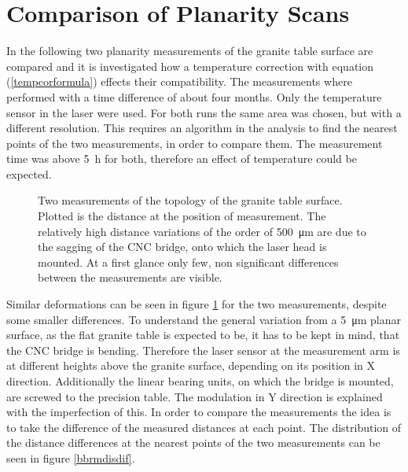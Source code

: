 \documentclass[
a4paper,                                %
twoside,                                %
BCOR1.4cm,                      %
10pt,                           %
headings=normal,                %
headsepline,                    %
clearplainpage, %
final,                                  %
div=14,
parskip=full,
openright,
bibliography=toc
]{scrreprt}
\begin{document}
\section{Comparison of Planarity Scans}\label{complanscan}

In the following two planarity measurements of the granite table surface are compared and it is investigated how a temperature correction with equation (\ref{tempcorformula}) effects their compatibility. The measurements where performed with a time difference of about four months. Only the temperature sensor in the laser were used. For both runs the same area was chosen, but with a different resolution. This requires an algorithm in the analysis to find the nearest points of the two measurements, in order to compare them. The measurement time was above \SI{5}{\hour} for both, therefore an effect of temperature could be expected.

\begin{figure}[H]	
	\centering
	\qquad
	\caption{Two measurements of the topology of the granite table surface. Plotted is the distance at the position of measurement. The relatively high distance variations of the order of \SI{500}{\micro\m} are due to the sagging of the CNC bridge, onto which the laser head is mounted. At a first glance only few, non significant differences between the measurements are visible.}
	\label{bbrms}
\end{figure}

Similar deformations can be seen in figure \ref{bbrms} for the two measurements, despite some smaller differences. To understand the general variation from a \SI{5}{\micro\m} planar surface, as the flat granite table is expected to be, it has to be kept in mind, that the CNC bridge is bending. Therefore the laser sensor at the measurement arm is at different heights above the granite surface, depending on its position in X direction. Additionally the linear bearing units, on which the bridge is mounted, are screwed to the precision table. The modulation in Y direction is explained with the imperfection of this. In order to compare the measurements the idea is to take the difference of the measured distances at each point. The distribution of the distance differences at the nearest points of the two measurements can be seen in figure \ref{bbrmdisdif}.
\end{document}
